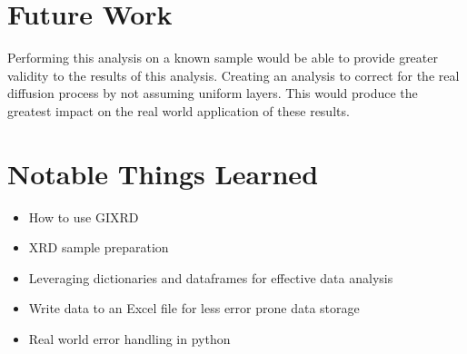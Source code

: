 \documentclass{article}
\begin{document}
\begin{multicols}{2}
\section{Future Work}

    Performing this analysis on a known sample would be able to provide greater validity to the results of this analysis.
    Creating an analysis to correct for the real diffusion process by not assuming uniform layers.
    This would produce the greatest impact on the real world application of these results.

\section{Notable Things Learned}

    \begin{itemize}
        \item How to use GIXRD
        \item XRD sample preparation
        \item Leveraging dictionaries and dataframes for effective data analysis
        \item Write data to an Excel file for less error prone data storage
        \item Real world error handling in python
    \end{itemize}




\end{multicols}


\end{document}
